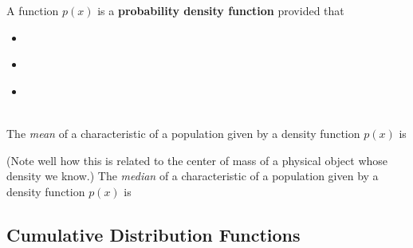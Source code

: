 \be
  \item A function $p(x)$ is a {\bf probability density function} provided that
	\begin{itemize}
	  \item \ \\	
 	  \item \ \\
	  \item \ \\ \ \\
	\end{itemize}
 The \emph{mean} of a characteristic of a population given by a density function $p(x)$ is


(Note well how this is related to the center of mass of a physical object whose density we know.)
 The \emph{median} of a characteristic of a population given by a density function $p(x)$ is
  


%

\subsection*{Cumulative Distribution Functions} 

%


\begin{summary}
  \item 
\end{summary}

\nin \hrulefill

 

\clearpage

